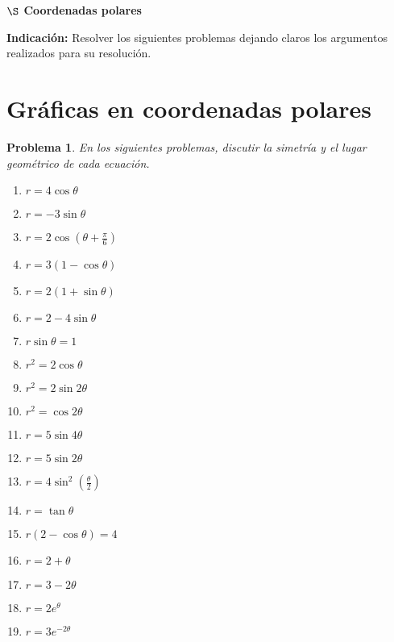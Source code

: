 \documentclass[letterpaper,12pt]{article}
\newtheorem{prob}{Problema}
\begin{document}
\begin{center}
\Large \textbf{$\S$ Coordenadas polares}
\end{center}
\textbf{Indicación:} Resolver los siguientes problemas dejando claros los argumentos realizados para su resolución.
\section{Gráficas en coordenadas polares}
\begin{prob}
En los siguientes problemas, discutir la simetría y el lugar geométrico de cada ecuación.
\begin{multicols}{3}
\begin{enumerate}[label=\alph*)]
    \item $r=4\cos{\theta}$
    \item $r=-3\sin{\theta}$
    \item $\displaystyle r=2\cos\left(\theta+\frac{\pi}{6}\right)$
    \item $r=3(1-\cos{\theta})$
    \item $r=2(1+\sin{\theta})$
    \item $r=2-4\sin{\theta}$
    \item $r\sin{\theta}=1$
    \item $r^2=2\cos{\theta}$
    \item $r^2=2\sin{2\theta}$
    \item $r^2=\cos{2\theta}$
    \item $r=5\sin{4\theta}$
    \item $r=5\sin{2\theta}$
    \item $\displaystyle r=4\sin^2\left(\frac{\theta}{2}\right)$
    \item $r=\tan{\theta}$
    \item $r(2-\cos{\theta})=4$
    \item $r=2+\theta$
    \item $r=3-2\theta$
    \item $r=2e^\theta$
    \item $r=3e^{-2\theta}$
\end{enumerate}
\end{multicols}
\end{prob}
\end{document}
